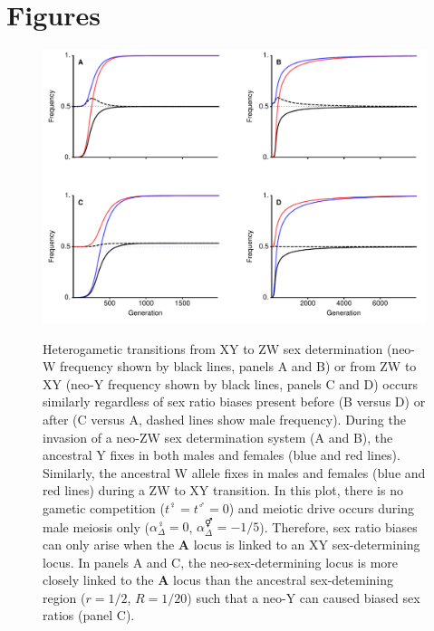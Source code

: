 \documentclass[12pt]{article}
\begin{document}



\newpage
\section*{Figures}
\newpage

\begin{figure}[!h]
\centering
\includegraphics[width=\linewidth]{Combination_Turnover}\\
\caption{
Heterogametic transitions from XY to ZW sex determination (neo-W frequency shown by black lines, panels A and B) or from ZW to XY (neo-Y frequency shown by black lines, panels C and D) occurs similarly regardless of sex ratio biases present before (B versus D) or after (C versus A, dashed lines show male frequency). 
During the invasion of a neo-ZW sex determination system (A and B), the ancestral Y fixes in both males and females (blue and red lines). 
Similarly, the ancestral W allele fixes in males and females (blue and red lines) during a ZW to XY transition. 
In this plot, there is no gametic competition ($t^\female=t^\male=0$) and meiotic drive occurs during male meiosis only ($\alpha^\female_{\Delta}=0$, $\alpha^\Hermaphrodite_{\Delta}=-1/5$). Therefore, sex ratio biases can only arise when the \textbf{A} locus is linked to an XY sex-determining locus.
In panels A and C, the neo-sex-determining locus is more closely linked to the \textbf{A} locus than the ancestral sex-detemining region ($r=1/2$, $R=1/20$) such that a neo-Y can caused biased sex ratios (panel C). 
}
\end{figure}
\end{document}
